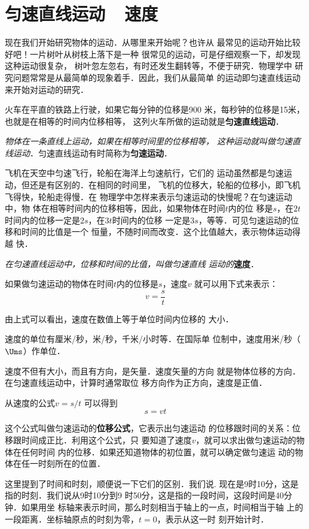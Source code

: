 \section{匀速直线运动~~速度}
    现在我们开始研究物体的运动．从哪里来开始呢？也许从
最常见的运动开始比较好吧！一片树叶从树枝上落下是一种
很常见的运动，可是仔细观察一下，却发现这种运动很复杂，
树叶忽左忽右，有时还发生翻转等，不便于研究．物理学中
研究问题常常是从最简单的现象着手．因此，我们从最简单
的运动即匀速直线运动来开始对运动的研究．

    火车在平直的铁路上行驶，如果它每分钟的位移是900
米，每秒钟的位移是15米，也就是在相等的时间内位移相等，
这列火车所做的运动就是\textbf{匀速直线运动}．

\textit{物体在一条直线上运动，如果在相等时间里的位移相等，
这种运动就叫做匀速直线运动}．匀速直线运动有时简称为\textbf{匀速运动}．

    飞机在天空中匀速飞行，轮船在海洋上匀速航行，它们的
运动虽然都是匀速运动，但还是有区别的．在相同的时间里，
飞机的位移大，轮船的位移小，即飞机飞得快，轮船走得慢．在
物理学中怎样来表示匀速运动的快慢呢？在匀速运动中，物
体在相等时间内的位移相等，因此，如果物体在时间$t$内的位
移是$s$，在$2t$时间内的位移一定是$2s$，在$3t$时间内的位移
一定是$3s$，等等．可见匀速运动的位移和时间的比值是一个
恒量，不随时间而改变．这个比值越大，表示物体运动得越
快．

\textit{在匀速直线运动中，位移和时间的比值，叫做匀速直线
运动的}\textbf{速度}．

如果做匀速运动的物体在时间$t$内的位移是$s$，速度$v$
就可以用下式来表示：
\[v=\frac{s}{t} \]

由上式可以看出，速度在数值上等于单位时间内位移的
大小．

    速度的单位有厘米/秒，米/秒，千米/小时等．在国际单
位制中，速度用米/秒（$\Ums$）作单位．

    速度不但有大小，而且有方向，是矢量．速度矢量的方向
就是物体位移的方向．在匀速直线运动中，计算时通常取位
移方向作为正方向，速度是正值．

从速度的公式$v=s/t$
可以得到
  \[s=vt \]

这个公式叫做匀速运动的\textbf{位移公式}，它表示出匀速运动
的位移跟时间的关系：位移跟时间成正比．利用这个公式，只
要知道了速度$v$，就可以求出做匀速运动的物体在任何时间
内的位移．如果还知道物体的初位置，就可以确定做匀速运
动的物体在任一时刻所在的位置．

这里提到了时间和时刻，顺便说一下它们的区别．我们说.
现在是9时10分，这是指的时刻．我们说从9时10分到9
时50分，这是指的一段时间，这段时间是40分钟．如果用坐
标轴来表示时间，那么时刻相当于轴上的一点，时间相当于轴
上的一段距离．坐标轴原点的时刻为零，$t=0$，表示从这一时
刻开始计时．

